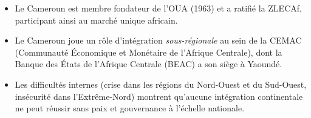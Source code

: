 \documentclass[11pt]{article}
\newcommand{\cle}[1]{{\popxbold\color{popdark}#1}}
\begin{document}
\begin{exemplebox}
\begin{itemize}
  \item Le Cameroun est membre fondateur de l'OUA (1963) et a ratifié la \cle{ZLECAf}, participant ainsi au marché unique africain.
  \item Le Cameroun joue un rôle d'intégration \emph{sous-régionale} au sein de la \cle{CEMAC} (Communauté Économique et Monétaire de l'Afrique Centrale), dont la Banque des États de l'Afrique Centrale (BEAC) a son siège à Yaoundé.
  \item Les difficultés internes (crise dans les régions du Nord-Ouest et du Sud-Ouest, insécurité dans l'Extrême-Nord) montrent qu'aucune intégration continentale ne peut réussir sans paix et gouvernance à l'échelle nationale.
\end{itemize}
\end{exemplebox}
\end{document}
